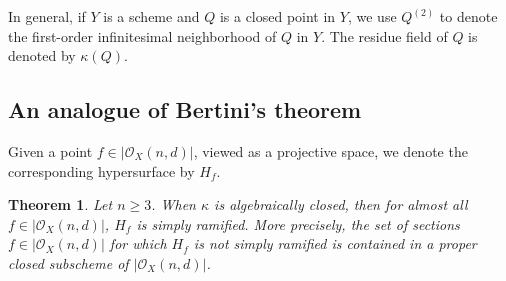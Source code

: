 \documentclass[12pt]{article}
\theoremstyle{plain}
\newtheorem{theorem}[equation]{Theorem}
\theoremstyle{definition}
\newcommand{\sO}{\mathcal{O}}
\newcommand{\<}{\langle}
\renewcommand{\>}{\rangle}
\begin{document}
In general, if $Y$ is a scheme and $Q$ is a closed point in $Y$, we use $Q^{(2)}$ to denote the first-order infinitesimal neighborhood of $Q$ in $Y$. The residue field of $Q$ is denoted by $\kappa(Q)$.

\subsection{An analogue of Bertini's theorem} 
Given a point $f \in |\sO_X(n,d)|$, viewed as a projective space, we denote the corresponding hypersurface by $H_f$. 
\begin{theorem}
Let $n \ge 3$. When $\kappa$ is algebraically closed, then for almost all $f \in |\sO_X(n,d)|$, $H_f$ is simply ramified. More precisely, the set of sections $f \in |\sO_X(n, d)|$ for which $H_f$ is not simply ramified is contained in a proper closed subscheme of $|\sO_X(n, d)|$. 
\end{theorem} 
\end{document}
